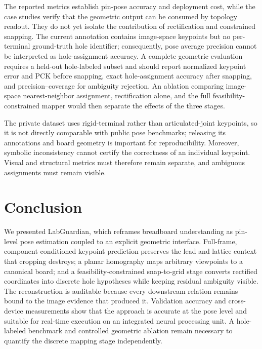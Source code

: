 \documentclass[conference]{IEEEtran}
\begin{document}
The reported metrics establish pin-pose accuracy and deployment cost, while the
case studies verify that the geometric output can be consumed by topology
readout. They do not yet isolate the contribution of rectification and constrained
snapping. The current annotation contains image-space keypoints but no
per-terminal ground-truth hole identifier; consequently, pose average precision
cannot be interpreted as hole-assignment accuracy. A complete geometric
evaluation requires a held-out hole-labeled subset and should report normalized
keypoint error and PCK before snapping, exact hole-assignment accuracy after
snapping, and precision--coverage for ambiguity rejection. An ablation comparing
image-space nearest-neighbor assignment, rectification alone, and the full
feasibility-constrained mapper would then separate the effects of the three
stages.

The private dataset uses rigid-terminal rather than articulated-joint keypoints,
so it is not directly comparable with public pose benchmarks; releasing its
annotations and board geometry is important for reproducibility. Moreover,
symbolic inconsistency cannot certify the correctness of an individual
keypoint. Visual and structural metrics must therefore remain separate, and
ambiguous assignments must remain visible.

\section{Conclusion}

We presented LabGuardian, which reframes breadboard understanding as pin-level
pose estimation coupled to an explicit geometric interface. Full-frame,
component-conditioned keypoint prediction preserves the lead and lattice context
that cropping destroys; a planar homography maps arbitrary viewpoints to a
canonical board; and a feasibility-constrained snap-to-grid stage converts
rectified coordinates into discrete hole hypotheses while keeping residual
ambiguity visible. The reconstruction is auditable because every downstream
relation remains bound to the image evidence that produced it. Validation accuracy and cross-device measurements show that the approach is
accurate at the pose level and suitable for real-time execution on an integrated
neural processing unit. A hole-labeled benchmark and controlled geometric
ablation remain necessary to quantify the discrete mapping stage independently.
\end{document}
